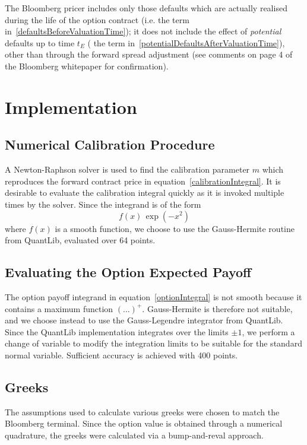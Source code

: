 \documentclass[11pt]{article}
\begin{document}
The Bloomberg pricer includes only those defaults which are actually realised during the life of the option contract (i.e. the term in~\ref{defaultsBeforeValuationTime}); it does not include the effect of {\em potential} defaults up to time $t_E$ ( the term in~\ref{potentialDefaultsAfterValuationTime}), other than through the forward spread adjustment (see comments on page 4 of the Bloomberg whitepaper for confirmation).

\section{Implementation}

\subsection{Numerical Calibration Procedure}

A Newton-Raphson solver is used to find the calibration parameter $m$ which reproduces the forward contract price in equation~\ref{calibrationIntegral}. It is desirable to evaluate the calibration integral quickly as it is invoked multiple times by the solver. Since the integrand is of the form
\begin{equation}
f(x) \, \exp(-x^2)
\end{equation}
where $f(x)$ is a smooth function, we choose to use the Gauss-Hermite routine from QuantLib, evaluated over 64 points.

\subsection{Evaluating the Option Expected Payoff}

The option payoff integrand in equation~\ref{optionIntegral} is not smooth because it contains a maximum function $( ... )^+$. Gauss-Hermite is therefore not suitable, and we choose instead to use the Gauss-Legendre integrator from QuantLib. Since the QuantLib implementation integrates over the limits $\pm 1$, we perform a change of variable to modify the integration limits to be suitable for the standard normal variable. Sufficient accuracy is achieved with 400 points.

\subsection{Greeks}

The assumptions used to calculate various greeks were chosen to match the Bloomberg terminal. Since the option value is obtained through a numerical quadrature, the greeks were calculated via a bump-and-reval approach.
\end{document}
